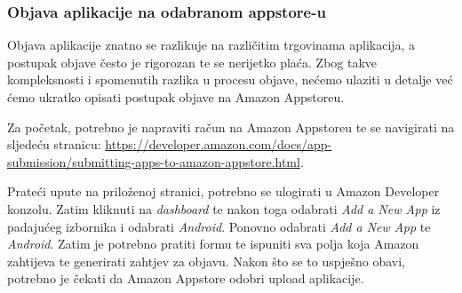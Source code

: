 		\subsubsection{Objava aplikacije na odabranom appstore-u}
		
		Objava aplikacije znatno se razlikuje na različitim trgovinama aplikacija, a postupak objave često je rigorozan te se nerijetko plaća. Zbog takve kompleksnosti i spomenutih razlika u procesu objave, nećemo ulaziti u detalje već ćemo ukratko opisati postupak objave na Amazon Appstoreu.
		
		Za početak, potrebno je napraviti račun na Amazon Appstoreu te se navigirati na sljedeću stranicu: \sloppy\url{https://developer.amazon.com/docs/app-submission/submitting-apps-to-amazon-appstore.html}.
		
		Prateći upute na priloženoj stranici, potrebno se ulogirati u Amazon Developer konzolu. Zatim kliknuti na \textit{dashboard} te nakon toga odabrati \textit{Add a New App} iz padajućeg izbornika i odabrati \textit{Android}. Ponovno odabrati \textit{Add a New App} te \textit{Android}. Zatim je potrebno pratiti formu te ispuniti sva polja koja Amazon zahtijeva te generirati zahtjev za objavu. Nakon što se to uspješno obavi, potrebno je čekati da Amazon Appstore odobri upload aplikacije.
		
		
		\eject
		